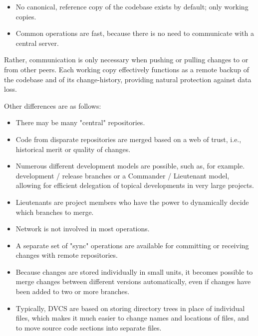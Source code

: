 \begin{itemize}[itemsep=1pt, parsep=1pt]
  \item No canonical, reference copy of the codebase exists by default; only
  working copies.
  \item Common operations are fast, because there is no need to communicate with
  a central server.
\end{itemize}

Rather, communication is only necessary when pushing or pulling changes to or
from other peers. Each working copy effectively functions as a remote backup of the codebase
and of its change-history, providing natural protection against data loss.

Other differences are as follows:
\begin{itemize}[itemsep=1pt, parsep=1pt]
  \item There may be many "central" repositories.
  \item Code from disparate repositories are merged based on a web of trust,
  i.e., historical merit or quality of changes.
  \item Numerous different development models are possible, such as, for
  example. development / release branches or a Commander / Lieutenant model,
  allowing for efficient delegation of topical developments in very large
  projects.
  \item Lieutenants are project members who have the power to dynamically decide
  which branches to merge.
  \item Network is not involved in most operations.
  \item A separate set of "sync" operations are available for committing or
  receiving changes with remote repositories.
  \item Because changes are stored individually in small units, it becomes
  possible to merge changes between different versions automatically, even if
  changes have been added to two or more branches.
  \item Typically, DVCS are based on storing directory trees in place of
  individual files, which makes it much easier to change names and locations of
  files, and to move source code sections into separate files.
\end{itemize}

